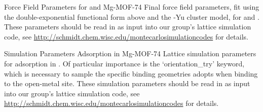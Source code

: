 \begin{subappendices}
\begin{section}{Force Field Parameters for {\co} and Mg-MOF-74}
\label{sec:lmoeda-params}
Final force field parameters, fit using the double-exponential functional form
above and the \mgmof-Yu cluster model, for \co and \mgmof. 
These parameters
should be read in as input into our group's lattice simulation code, see 
\url{http://schmidt.chem.wisc.edu/montecarlosimulationcodes} for details.

\tiny

\normalsize

\end{section}
\clearpage
\begin{section}{Simulation Parameters {\co} Adsorption in Mg-MOF-74}
Lattice simulation parameters for \co adsorption in \mgmof. Of particular
importance is the `orientation\_try' keyword, which is necessary to sample the
specific binding geometries \co adopts when binding to the open-metal site.
These simulation parameters
should be read in as input into our group's lattice simulation code, see 
\url{http://schmidt.chem.wisc.edu/montecarlosimulationcodes} for details.

\tiny

\normalsize

\end{section}

\end{subappendices}
